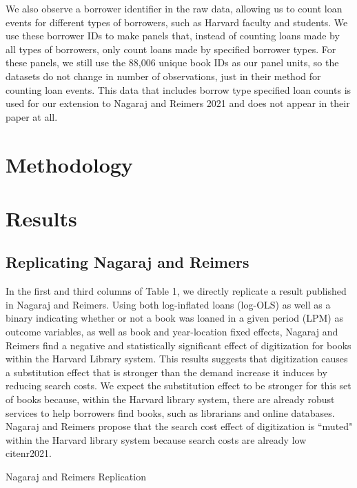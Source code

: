 \documentclass{article}
\begin{document}
We also observe a borrower identifier in the raw data, allowing us to count loan events for different types of borrowers, such as Harvard faculty and students. We use these borrower IDs to make panels that, instead of counting loans made by all types of borrowers, only count loans made by specified borrower types. For these panels, we still use the 88,006 unique book IDs as our panel units, so the datasets do not change in number of observations, just in their method for counting loan events. This data that includes borrow type specified loan counts is used for our extension to Nagaraj and Reimers 2021 and does not appear in their paper at all. 
\section{Methodology}



\section{Results}
\subsection{Replicating Nagaraj and Reimers}

In the first and third columns of Table 1, we directly replicate a result published in Nagaraj and Reimers. Using both log-inflated loans (log-OLS) as well as a binary indicating whether or not a book was loaned in a given period (LPM) as outcome variables, as well as book and year-location fixed effects, Nagaraj and Reimers find a negative and statistically significant effect of digitization for books within the Harvard Library system. This results suggests that digitization causes a substitution effect that is stronger than the demand increase it induces by reducing search costs. We expect the substitution effect to be stronger for this set of books because, within the Harvard library system, there are already robust services to help borrowers find books, such as librarians and online databases. Nagaraj and Reimers propose that the search cost effect of digitization is ``muted" within the Harvard library system because search costs are already low cite{nr2021}. 

\begin{table}[htbp]
   \centering
   \caption{Nagaraj and Reimers Replication}
  
   \label{tab:booktabs}
\end{table}
\end{document}
